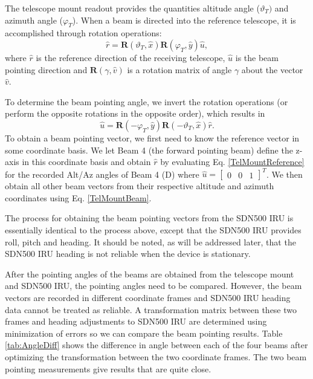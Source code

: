 \documentclass[12pt,twoside,english]{article}\usepackage[]{graphicx}\usepackage[]{color}
\begin{document}
{{The telescope mount readout provides the quantities altitude angle ($\vartheta_{T})$ and azimuth angle ($\varphi_{T}$). When a beam is directed into the reference telescope, it is accomplished through rotation operations:  
\begin{equation}
\hat{r}=\mathbf{R}(\vartheta_{T},\hat{x})\mathbf{R}(\varphi_{T},\hat{y})\hat{u},\label{TelMountReference}
\end{equation}
where $\hat{r}$ is the reference direction of the receiving telescope, $\hat{u}$ is the beam pointing direction and $\mathbf{R}(\gamma,\hat{v})$ is a rotation matrix of angle $\gamma$ about the vector $\hat{v}$. 

To determine the beam pointing angle, we invert the rotation operations (or perform the opposite rotations in the opposite order), which results in  
\begin{equation}
\hat{u}=\mathbf{R}(-\varphi_{T},\hat{y})\mathbf{R}(-\vartheta_{T},\hat{x})\hat{r}.\label{TelMountBeam}
\end{equation}
To obtain a beam pointing vector, we first need to know the reference vector in some coordinate basis. We let Beam 4 (the forward pointing beam) define the z-axis in this coordinate basis and obtain $\hat{r}$ by evaluating Eq. \eqref{TelMountReference} for the recorded Alt/Az angles of Beam 4 (D) where $\hat{u}=\left[\begin{array}{ccc} 0 & 0 & 1\end{array}\right]^{T}$. We then obtain all other beam vectors from their respective altitude and azimuth coordinates using Eq. \eqref{TelMountBeam}. 

The process for obtaining the beam pointing vectors from the SDN500 IRU is essentially identical to the process above, except that the SDN500 IRU provides roll, pitch and heading. It should be noted, as will be addressed later, that the SDN500 IRU heading is not reliable when the device is stationary. 

After the pointing angles of the beams are obtained from the telescope mount and SDN500 IRU, the pointing angles need to be compared. However, the beam vectors are recorded in different coordinate frames and SDN500 IRU heading data cannot be treated as reliable. A transformation matrix between these two frames and heading adjustments to SDN500 IRU are determined using minimization of errors so we can compare the beam pointing results. Table \ref{tab:AngleDiff} shows the difference in angle between each of the four beams after optimizing the transformation between the two coordinate frames. The two beam pointing measurements give results that are quite close. 

}}
\end{document}
